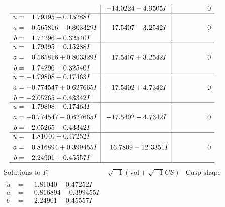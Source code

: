 \documentclass[1p]{elsarticle_modified}
\theoremstyle{definition}
\newcommand{\I}{\sqrt{-1}}
\begin{document}
$$\begin{array}{c|c|c}
 & -14.0224 - 4.9505 I & \phantom{-0.000000 } 0 \\ \hline\begin{aligned}
u &= \phantom{-}1.79395 + 0.15288 I \\
a &= \phantom{-}0.565816 - 0.803329 I \\
b &= \phantom{-}1.74296 - 0.32540 I\end{aligned}
 & \phantom{-}17.5407 - 3.2542 I & \phantom{-0.000000 } 0 \\ \hline\begin{aligned}
u &= \phantom{-}1.79395 - 0.15288 I \\
a &= \phantom{-}0.565816 + 0.803329 I \\
b &= \phantom{-}1.74296 + 0.32540 I\end{aligned}
 & \phantom{-}17.5407 + 3.2542 I & \phantom{-0.000000 } 0 \\ \hline\begin{aligned}
u &= -1.79808 + 0.17463 I \\
a &= -0.774547 + 0.627665 I \\
b &= -2.05265 + 0.43342 I\end{aligned}
 & -17.5402 + 4.7342 I & \phantom{-0.000000 } 0 \\ \hline\begin{aligned}
u &= -1.79808 - 0.17463 I \\
a &= -0.774547 - 0.627665 I \\
b &= -2.05265 - 0.43342 I\end{aligned}
 & -17.5402 - 4.7342 I & \phantom{-0.000000 } 0 \\ \hline\begin{aligned}
u &= \phantom{-}1.81040 + 0.47252 I \\
a &= \phantom{-}0.816894 + 0.399455 I \\
b &= \phantom{-}2.24901 + 0.45557 I\end{aligned}
 & \phantom{-}16.7809 - 12.3351 I & \phantom{-0.000000 } 0\\
 \hline 
 \end{array}$$\newpage$$\begin{array}{c|c|c}  
\text{Solutions to }I^u_{1}& \I (\text{vol} + \sqrt{-1}CS) & \text{Cusp shape}\\
 \hline 
\begin{aligned}
u &= \phantom{-}1.81040 - 0.47252 I \\
a &= \phantom{-}0.816894 - 0.399455 I \\
b &= \phantom{-}2.24901 - 0.45557 I\end{aligned}

\end{array}$$
\end{document}
